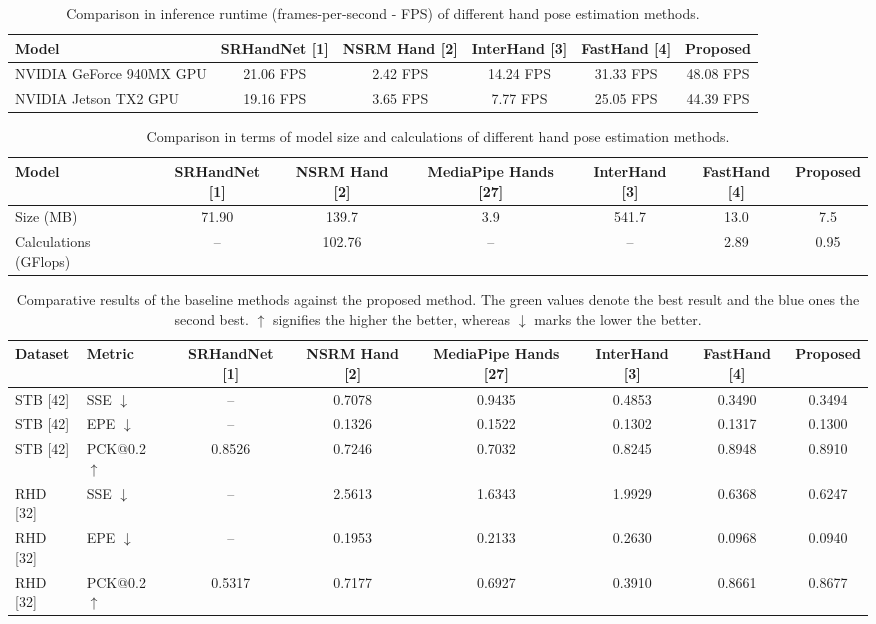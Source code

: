 \documentclass[11pt]{article}
\begin{document}
\begin{table}[h!]
\centering
\caption{Comparison in inference runtime (frames-per-second - FPS) of different hand pose estimation methods.}
\begin{tabular}{@{}lccccc@{}}
\toprule
Model & SRHandNet [1] & NSRM Hand [2] & InterHand [3] & FastHand [4] & Proposed \\
\midrule
NVIDIA GeForce 940MX GPU & 21.06 FPS & 2.42 FPS & 14.24 FPS & 31.33 FPS & 48.08 FPS \\
NVIDIA Jetson TX2 GPU & 19.16 FPS & 3.65 FPS & 7.77 FPS & 25.05 FPS & 44.39 FPS \\
\bottomrule
\end{tabular}
\end{table}

\begin{table}[h!]
\centering
\caption{Comparison in terms of model size and calculations of different hand pose estimation methods.}
\begin{tabular}{@{}lcccccc@{}}
\toprule
Model & SRHandNet [1] & NSRM Hand [2] & MediaPipe Hands [27] & InterHand [3] & FastHand [4] & Proposed \\
\midrule
Size (MB) & 71.90 & 139.7 & 3.9 & 541.7 & 13.0 & 7.5 \\
Calculations (GFlops) & -- & 102.76 & -- & -- & 2.89 & 0.95 \\
\bottomrule
\end{tabular}
\end{table}

\begin{table}[h!]
\centering
\caption{Comparative results of the baseline methods against the proposed method. The green values denote the best result and the blue ones the second best. $\uparrow$ signifies the higher the better, whereas $\downarrow$ marks the lower the better.}
\begin{tabular}{@{}llcccccc@{}}
\toprule
Dataset & Metric & SRHandNet [1] & NSRM Hand [2] & MediaPipe Hands [27] & InterHand [3] & FastHand [4] & Proposed \\
\midrule
STB [42] & SSE $\downarrow$ & -- & 0.7078 & 0.9435 & 0.4853 & 0.3490 & 0.3494 \\
STB [42] & EPE $\downarrow$ & -- & 0.1326 & 0.1522 & 0.1302 & 0.1317 & 0.1300 \\
STB [42] & PCK@0.2 $\uparrow$ & 0.8526 & 0.7246 & 0.7032 & 0.8245 & 0.8948 & 0.8910 \\
RHD [32] & SSE $\downarrow$ & -- & 2.5613 & 1.6343 & 1.9929 & 0.6368 & 0.6247 \\
RHD [32] & EPE $\downarrow$ & -- & 0.1953 & 0.2133 & 0.2630 & 0.0968 & 0.0940 \\
RHD [32] & PCK@0.2 $\uparrow$ & 0.5317 & 0.7177 & 0.6927 & 0.3910 & 0.8661 & 0.8677 \\
\bottomrule
\end{tabular}
\end{table}
\end{document}
